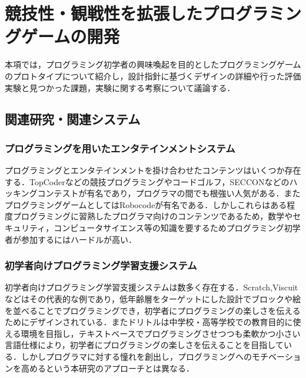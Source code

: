 \section{競技性・観戦性を拡張したプログラミングゲームの開発}
本項では，プログラミング初学者の興味喚起を目的としたプログラミングゲームのプロトタイプについて紹介し，設計指針に基づくデザインの詳細や行った評価実験と見つかった課題，実験に関する考察について議論する．

\subsection{関連研究・関連システム}

\subsubsection{プログラミングを用いたエンタテインメントシステム}
プログラミングとエンタテインメントを掛け合わせたコンテンツはいくつか存在する．TopCoder\cite{topcoder}などの競技プログラミングやコードゴルフ\cite{codegolf}，SECCON\cite{seccon}などのハッキングコンテストが有名であり，プログラマの間でも根強い人気がある．またプログラミングゲームとしてはRobocode\cite{robocode}が有名である．しかしこれらはある程度プログラミングに習熟したプログラマ向けのコンテンツであるため，数学やセキュリティ，コンピュータサイエンス等の知識を要するためプログラミング初学者が参加するにはハードルが高い．

\subsubsection{初学者向けプログラミング学習支援システム}
初学者向けプログラミング学習支援システムは数多く存在する．Scratch\cite{scratch},Viscuit\cite{viscuit}などはその代表的な例であり，低年齢層をターゲットにした設計でブロックや絵を並べることでプログラミングでき，初学者にプログラミングの楽しさを伝えるためにデザインされている．またドリトル\cite{dolittle}は中学校・高等学校での教育目的に使える環境を目指し，テキストベースでプログラミングさせつつも柔軟かつ小さい言語仕様により，初学者にプログラミングの楽しさを伝えることを目指している．しかしプログラマに対する憧れを創出し，プログラミングへのモチベーションを高めるという本研究のアプローチとは異なる．

